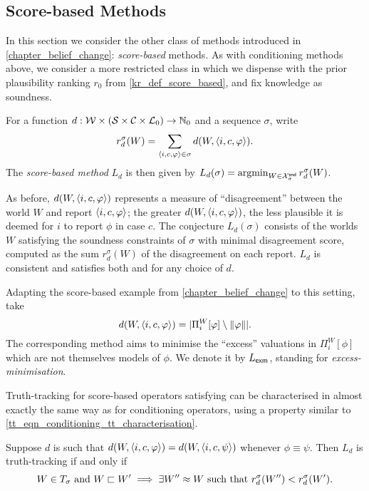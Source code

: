 \subsection{Score-based Methods}

In this section we consider the other class of methods introduced in
\cref{chapter_belief_change}: \emph{score-based} methods. As with conditioning
methods above, we consider a more restricted class in which we dispense with
the prior plausibility ranking $r_0$ from \cref{kr_def_score_based}, and fix
knowledge as soundness.

\begin{definition}
    For a function $d: \mathcal{W} \times (\mathcal{S} \times \mathcal{C} \times \mathcal{L}_0) \to
    \mathbb{N}_{0}$ and a sequence $\sigma$, write
    \[
        r_d^\sigma(W)
        = \sum_{\langle {i, c, \varphi} \rangle \in \sigma}{d(W, \langle {i, c, \varphi} \rangle)}.
    \]
    The \emph{score-based method} $L_d$ is then given by
    $L_d(\sigma) = \argmin_{W \in \Xsnd_\sigma}{r_d^\sigma(W)}$.
\end{definition}

As before, $d(W, \langle {i, c, \varphi} \rangle)$ represents a measure of ``disagreement''
between the world $W$ and report $\langle {i, c, \varphi} \rangle$; the greater $d(W,
\langle {i, c, \varphi} \rangle)$, the less plausible it is deemed for $i$ to report $\phi$
in case $c$. The conjecture $L_d(\sigma)$ consists of the worlds $W$ satisfying
the soundness constraints of $\sigma$ with minimal disagreement score, computed
as the sum $r_d^\sigma(W)$ of the disagreement on each report.
%
$L_d$ is consistent and satisfies both \repetition{} and \soundness{} for any
choice of $d$.

\begin{example}
    \label{tt_ex_exm}
    Adapting the score-based example from \cref{chapter_belief_change} to this
    setting, take
    \[
        d(W, \langle {i, c, \varphi} \rangle)
        = |\Pi^W_i[\varphi] \setminus \|{\varphi}\||.
    \]
    The corresponding method aims to minimise the ``excess'' valuations
    in $\Pi^W_i[\phi]$ which are not themselves models of $\phi$. We denote
    it by $L_{\mathsf{exm}}$, standing for \emph{excess-minimisation}.
\end{example}

Truth-tracking for score-based operators satisfying \equivalence{} can be
characterised in almost exactly the same way as for conditioning operators,
using a property similar to \cref{tt_eqn_conditioning_tt_characterisation}.

\begin{theorem}
    \label{tt_thm_scorebased_tt_suff_cond}
    Suppose $d$ is such that $d(W, \langle {i, c, \varphi} \rangle) = d(W, \langle {i, c,
    \psi} \rangle)$ whenever $\phi \equiv \psi$. Then $L_d$ is truth-tracking if and
    only if
    \begin{equation}
        \label{tt_eqn_scorebased_tt_characterisation}
        W \in T_\sigma \text{ and }
            W \sqsubset W'
                \implies
                    \exists W'' \approx W \text{ such that }
                        r_d^\sigma(W'') < r_d^\sigma(W').
    \end{equation}
\end{theorem}

